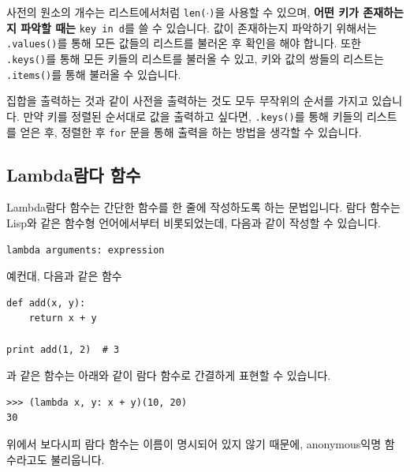 \documentclass[../main.tex]{subfiles}
\begin{document}
사전의 원소의 개수는 리스트에서처럼 \texttt{len($\cdot$)}을 사용할 수 있으며, \textbf{어떤 키가 존재하는지 파악할 때는} \texttt{key in d}를 쓸 수 있습니다.
값이 존재하는지 파악하기 위해서는 \texttt{.values()}를 통해 모든 값들의 리스트를 불러온 후 확인을 해야 합니다.
또한 \texttt{.keys()}를 통해 모든 키들의 리스트를 불러올 수 있고, 키와 값의 쌍들의 리스트는 \texttt{.items()}를 통해 불러올 수 있습니다.

집합을 출력하는 것과 같이 사전을 출력하는 것도 모두 무작위의 순서를 가지고 있습니다.
만약 키를 정렬된 순서대로 값을 출력하고 싶다면, \texttt{.keys()}를 통해 키들의 리스트를 얻은 후, 정렬한 후 \texttt{for} 문을 통해 출력을 하는 방법을 생각할 수 있습니다.

\subsection{Lambda람다 함수}
Lambda람다 함수는 간단한 함수를 한 줄에 작성하도록 하는 문법입니다.
람다 함수는 Lisp와 같은 함수형 언어에서부터 비롯되었는데, 다음과 같이 작성할 수 있습니다.
\begin{verbatim}
lambda arguments: expression
\end{verbatim}
예컨대, 다음과 같은 함수
\begin{verbatim}
def add(x, y):
    return x + y

print add(1, 2)  # 3
\end{verbatim}
과 같은 함수는 아래와 같이 람다 함수로 간결하게 표현할 수 있습니다.
\begin{verbatim}
>>> (lambda x, y: x + y)(10, 20)
30
\end{verbatim}
위에서 보다시피 람다 함수는 이름이 명시되어 있지 않기 때문에, anonymous익명 함수라고도 불리웁니다.
\end{document}

